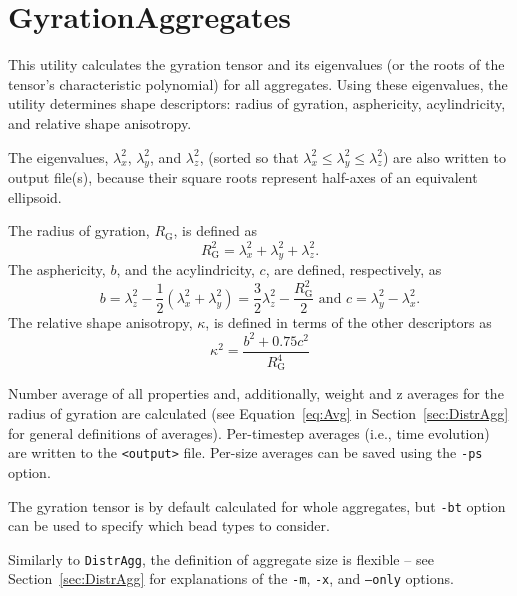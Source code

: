 \section{GyrationAggregates} \label{sec:GyrationAggregates}

This utility calculates the gyration tensor and its eigenvalues (or the
roots of the tensor's characteristic polynomial) for all aggregates. Using
these eigenvalues, the utility determines shape descriptors:
radius of gyration, asphericity, acylindricity, and relative shape
anisotropy.

The eigenvalues, $\lambda_x^2$, $\lambda_y^2$, and $\lambda_z^2$, (sorted
so that $\lambda_x^2\leq\lambda_y^2\leq\lambda_z^2$) are also written to
output file(s), because their square roots represent half-axes of an
equivalent ellipsoid.

The radius of gyration, $R_{\mathrm{G}}$, is defined as
\begin{equation} \label{eq:R_G}
  R_{\mathrm{G}}^2 = \lambda_x^2 + \lambda_y^2 + \lambda_z^2.
\end{equation}
The asphericity, $b$, and the acylindricity, $c$, are defined,
respectively, as
\begin{equation} \label{eq:b}
  b= \lambda_z^2 - \frac{1}{2}(\lambda_x^2 + \lambda_y^2) =
    \frac{3}{2}\lambda_z^2 - \frac{R_{\mathrm{G}}^2}{2}
  \mbox{ \ \ and \ \ }
  c = \lambda_y^2 - \lambda_x^2.
\end{equation}
The relative shape anisotropy, $\kappa$, is defined in terms of the other
descriptors as
\begin{equation} \label{eq:anis}
  \kappa^2 = \frac{b^2 + 0.75 c^2}{R_{\mathrm{G}}^4}
\end{equation}

Number average of all properties and, additionally, weight and z averages
for the radius of gyration are calculated (see Equation~\eqref{eq:Avg} in
Section~\ref{sec:DistrAgg} for general definitions of averages).
Per-timestep averages (i.e., time evolution) are written to the
\texttt{<output>} file. Per-size averages can be saved using the
\texttt{-ps} option.

The gyration tensor is by default calculated for whole aggregates, but
\texttt{-bt} option can be used to specify which bead types to consider.

Similarly to \texttt{DistrAgg}, the definition of aggregate size is
flexible -- see Section~\ref{sec:DistrAgg} for explanations of the
\texttt{-m}, \texttt{-x}, and \texttt{--only} options.

